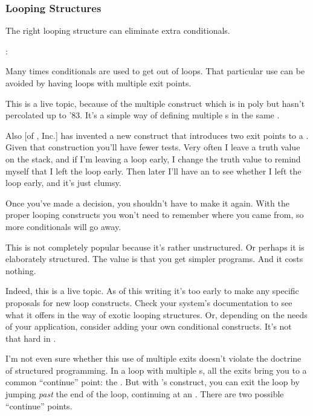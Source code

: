 \subsubsection{Looping Structures}%
%
The right looping structure can eliminate extra conditionals.
\begin{interview}
:
\begin{tfquot}
Many times conditionals are used to get out of loops. That particular use
can be avoided by having loops with multiple exit points.

This is a live topic, because of the multiple  construct which is in
poly\Forth{} but hasn't percolated up to \Forth{} '83. It's a simple way of
defining multiple s in the same .

Also  [of \Forth{}, Inc.] has invented a new construct that
introduces two exit points to a .
Given that construction you'll have fewer tests. Very often I leave a
truth value on the stack, and if I'm leaving a loop early, I change
the truth value to remind myself that I left the loop early. Then
later I'll have an  to see whether I left the loop early,
and it's just clumsy.

Once you've made a decision, you shouldn't have to make it again. With the
proper looping constructs you won't need to remember where you came
from, so more conditionals will go away.

This is not completely popular because it's rather unstructured. Or perhaps
it is elaborately structured. The value is that you get simpler programs.
And it costs nothing.
\end{tfquot}
\end{interview}
Indeed, this is a live topic. As of this writing it's too early to make any
specific proposals for new loop constructs. Check your system's
documentation to see what it offers in the way of exotic looping structures.
Or, depending on the needs of your application, consider adding
your own conditional constructs. It's not that hard in \Forth{}.

I'm not even sure whether this use of multiple exits doesn't violate
the doctrine of structured programming. In a 
loop with multiple s, all the exits bring you to a common
``continue'' point: the . But with 's construct, you
can exit the loop by jumping \emph{past} the end of the loop, continuing
at an . There are two possible ``continue'' points.

